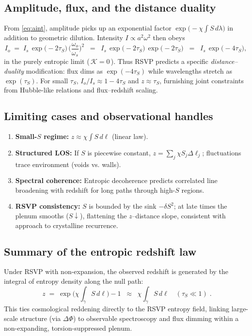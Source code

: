 \documentclass[a4paper,11pt,openany]{book}
\begin{document}
\subsection{Amplitude, flux, and the distance duality}

From \eqref{eq:aint}, amplitude picks up an exponential factor $\exp\!\big(-\chi\!\int S\,d\lambda\big)$
in addition to geometric dilution. Intensity $I\propto a^2\omega^2$ then obeys
\[
I_o \;=\; I_s \,\exp\!\big(-2\tau_S\big)\,\Big(\frac{\omega_o}{\omega_s}\Big)^{2}
\;\;=\;\; I_s \,\exp\!\big(-2\tau_S\big)\,\exp\!\big(-2\tau_S\big)
\;\;=\;\; I_s\,\exp\!\big(-4\tau_S\big),
\]
in the purely entropic limit (\,$\mathcal{K}=0$\,). Thus RSVP predicts a specific \emph{distance–duality}
modification: flux dims as $\exp(-4\tau_S)$ while wavelengths stretch as $\exp(\tau_S)$.
For small $\tau_S$, $I_o/I_s \approx 1 - 4\tau_S$ and $z \approx \tau_S$, furnishing
joint constraints from Hubble-like relations and flux–redshift scaling.

\subsection{Limiting cases and observational handles}

\begin{enumerate}
  \item \textbf{Small-$S$ regime:} $z \approx \chi\!\int S\,d\ell$ (linear law).
  \item \textbf{Structured LOS:} If $S$ is piecewise constant, 
  $z = \sum_j \chi S_j \Delta \ell_j$; fluctuations trace environment (voids vs. walls).
  \item \textbf{Spectral coherence:} Entropic decoherence predicts correlated line broadening 
  with redshift for long paths through high-$S$ regions.
  \item \textbf{RSVP consistency:} $S$ is bounded by the sink $-\delta S^2$; at late times
  the plenum smooths ($S\!\downarrow$), flattening the $z$–distance slope, consistent with
  approach to crystalline recurrence.
\end{enumerate}

\subsection{Summary of the entropic redshift law}

Under RSVP with non-expansion, the observed redshift is generated by the integral of entropy
density along the null path:
\[
\boxed{\;\; z \;=\; \exp\!\Big(\chi \!\!\int_{\gamma} S\,d\ell\Big) - 1 
\;\;\approx\;\; \chi \!\!\int_{\gamma} S\,d\ell \quad (\tau_S\ll 1)\;. \;}
\]
This ties cosmological reddening directly to the RSVP entropy field, linking large-scale
structure (via $\Delta\Phi$) to observable spectroscopy and flux dimming within a
non-expanding, torsion-suppressed plenum.
\end{document}

